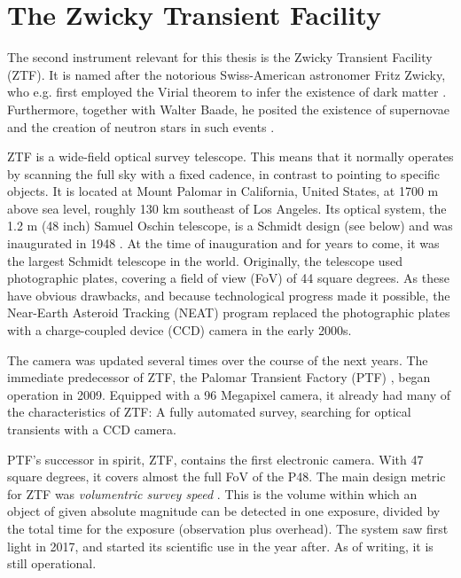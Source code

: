 \chapter{The Zwicky Transient Facility}
The second instrument relevant for this thesis is the Zwicky Transient Facility (ZTF). It is named after the notorious Swiss-American astronomer Fritz Zwicky, who e.g. first employed the Virial theorem to infer the existence of dark matter . Furthermore, together with Walter Baade, he posited the existence of supernovae and the creation of neutron stars in such events .

ZTF is a wide-field optical survey telescope. This means that it normally operates by scanning the full sky with a fixed cadence, in contrast to pointing to specific objects. It is located at Mount Palomar in California, United States, at 1700 m above sea level, roughly 130 km southeast of Los Angeles. Its optical system, the 1.2 m (48 inch) Samuel Oschin telescope, is a Schmidt design (see below) and was inaugurated in 1948 \cite{Harrington1952}. At the time of inauguration and for years to come, it was the largest Schmidt telescope in the world. Originally, the telescope used photographic plates, covering a field of view (FoV) of 44 square degrees. As these have obvious drawbacks, and because technological progress made it possible, the Near-Earth Asteroid Tracking (NEAT) program  replaced the photographic plates with a charge-coupled device (CCD) camera in the early 2000s.

The camera was updated several times over the course of the next years. The immediate predecessor of ZTF, the Palomar Transient Factory (PTF) , began operation in 2009. Equipped with a 96 Megapixel camera, it already had many of the characteristics of ZTF: A fully automated survey, searching for optical transients with a CCD camera.

PTF's successor in spirit, ZTF, contains the first electronic camera. With 47 square degrees, it covers almost the full FoV of the P48. The main design metric for ZTF was \textit{volumentric survey speed} . This is the volume within which an object of given absolute magnitude can be detected in one exposure, divided by the total time for the exposure (observation plus overhead). The system saw first light in 2017, and started its scientific use in the year after. As of writing, it is still operational.

